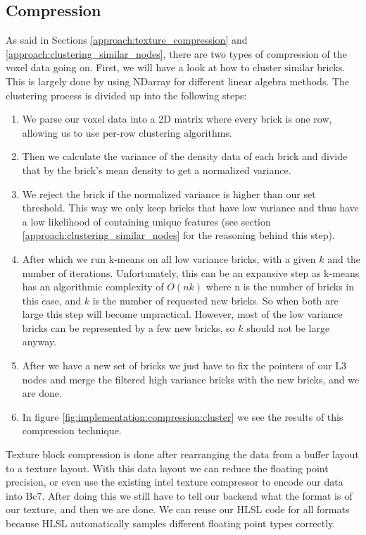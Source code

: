 \subsection{Compression} \label{implementation:compression}
As said in Sections \ref{approach:texture_compression} and \ref{approach:clustering_similar_nodes}, there are two types of compression of the voxel data going on. First, we will have a look at how to cluster similar bricks. This is largely done by using NDarray \cite{NDarray} for different linear algebra methods. The clustering process is divided up into the following steps:

\begin{enumerate}
    \itemsep0em
    \item We parse our voxel data into a 2D matrix where every brick is one row, allowing us to use per-row clustering algorithms.
    \item Then we calculate the variance of the density data of each brick and divide that by the brick's mean density to get a normalized variance.
    \item We reject the brick if the normalized variance is higher than our set threshold. This way we only keep bricks that have low variance and thus have a low likelihood of containing unique features (see section \ref{approach:clustering_similar_nodes} for the reasoning behind this step).
    \item After which we run k-means on all low variance bricks, with a given $k$ and the number of iterations. Unfortunately, this can be an expansive step as k-means has an algorithmic complexity of $O(nk)$ where n is the number of bricks in this case, and $k$ is the number of requested new bricks. So when both are large this step will become unpractical. However, most of the low variance bricks can be represented by a few new bricks, so $k$ should not be large anyway.
    \item After we have a new set of bricks we just have to fix the pointers of our L3 nodes and merge the filtered high variance bricks with the new bricks, and we are done.
    \item In figure \ref{fig:implementation:compression:cluster} we see the results of this compression technique.
\end{enumerate}


\noindent Texture block compression is done after rearranging the data from a buffer layout to a texture layout. With this data layout we can reduce the floating point precision, or even use the existing intel texture compressor \cite{ISPCTextureCompressor} to encode our data into Bc7. After doing this we still have to tell our backend what the format is of our texture, and then we are done. We can reuse our HLSL code for all formats because HLSL automatically samples different floating point types correctly.




